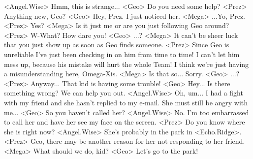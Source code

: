 <Angel.Wise> Hmm, this is strange... 
<Geo> Do you need some help? 
<Prez> Anything new, Geo? 
<Geo> Hey, Prez. I just noticed her. 
<Mega> ...Yo, Prez. 
<Prez> Yes? 
<Mega> Is it just me or are you just following Geo around? 
<Prez> W-What? How dare you! 
<Geo> ...? 
<Mega> It can't be sheer luck that you just show up as soon as Geo finds someone. 
<Prez> Since Geo is unreliable I've just been checking in on him from time to time! 
I can't let him mess up, because his mistake will hurt the whole Team! 
I think we're just having a misunderstanding here, Omega-Xis. 
<Mega> Is that so... Sorry. 
<Geo> ...? 
<Prez> Anyway... That kid is having some trouble! 
<Geo> Hey... Is there something wrong? 
We can help you out. 
<Angel.Wise> Oh, um... 
I had a fight with my friend and she hasn't replied to my e-mail. 
She must still be angry with me... 
<Geo> So you haven't called her? 
<Angel.Wise> No. I'm too embarrassed to call her and have her see my face on the screen. 
<Prez> Do you know where she is right now? 
<Angel.Wise> She's probably in the park in <Echo.Ridge>. 
<Prez> Geo, there may be another reason for her not  responding to her friend. 
<Mega> What should we do, kid? 
<Geo> Let's go to the park! 
